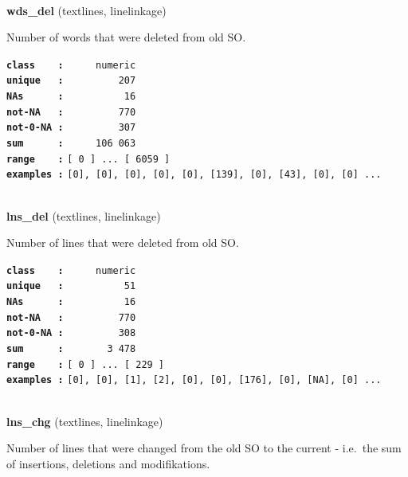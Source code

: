 \documentclass[]{article}
\begin{document}
~

\textbf{wds\_del} (textlines, linelinkage)

Number of words that were deleted from old SO.

\textbf{\texttt{class\ \ \ \ :}} \texttt{~~~~~numeric}\\
\textbf{\texttt{unique\ \ \ :}} \texttt{~~~~~~~~~207}\\
\textbf{\texttt{NAs\ \ \ \ \ \ :}} \texttt{~~~~~~~~~~16}\\
\textbf{\texttt{not-NA\ \ \ :}} \texttt{~~~~~~~~~770}\\
\textbf{\texttt{not-0-NA\ :}} \texttt{~~~~~~~~~307}\\
\textbf{\texttt{sum\ \ \ \ \ \ :}} \texttt{~~~~~106~063}\\
\textbf{\texttt{range\ \ \ \ :}}
\texttt{{[}\ 0\ {]}\ ...\ {[}\ 6059\ {]}}\\
\textbf{\texttt{examples\ :}}
\texttt{{[}0{]},\ {[}0{]},\ {[}0{]},\ {[}0{]},\ {[}0{]},\ {[}139{]},\ {[}0{]},\ {[}43{]},\ {[}0{]},\ {[}0{]}\ ...}\\

~

\textbf{lns\_del} (textlines, linelinkage)

Number of lines that were deleted from old SO.

\textbf{\texttt{class\ \ \ \ :}} \texttt{~~~~~numeric}\\
\textbf{\texttt{unique\ \ \ :}} \texttt{~~~~~~~~~~51}\\
\textbf{\texttt{NAs\ \ \ \ \ \ :}} \texttt{~~~~~~~~~~16}\\
\textbf{\texttt{not-NA\ \ \ :}} \texttt{~~~~~~~~~770}\\
\textbf{\texttt{not-0-NA\ :}} \texttt{~~~~~~~~~308}\\
\textbf{\texttt{sum\ \ \ \ \ \ :}} \texttt{~~~~~~~3~478}\\
\textbf{\texttt{range\ \ \ \ :}}
\texttt{{[}\ 0\ {]}\ ...\ {[}\ 229\ {]}}\\
\textbf{\texttt{examples\ :}}
\texttt{{[}0{]},\ {[}0{]},\ {[}1{]},\ {[}2{]},\ {[}0{]},\ {[}0{]},\ {[}176{]},\ {[}0{]},\ {[}NA{]},\ {[}0{]}\ ...}\\

~

\textbf{lns\_chg} (textlines, linelinkage)

Number of lines that were changed from the old SO to the current -
i.e.~the sum of insertions, deletions and modifikations.
\end{document}
